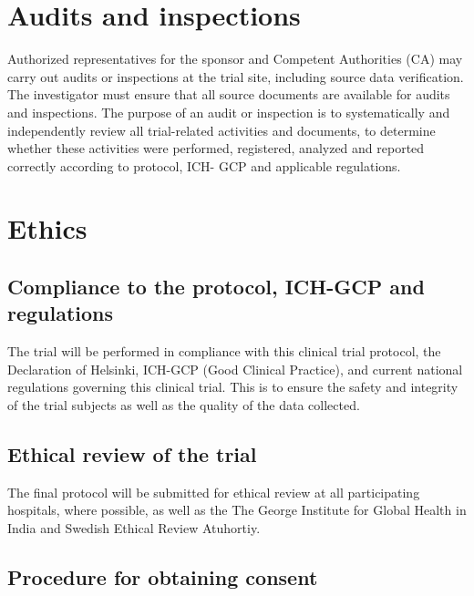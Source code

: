 \documentclass[
]{scrartcl}
\begin{document}
\hypertarget{audits-and-inspections}{%
\section{Audits and inspections}\label{audits-and-inspections}}

Authorized representatives for the sponsor and Competent Authorities
(CA) may carry out audits or inspections at the trial site, including
source data verification. The investigator must ensure that all source
documents are available for audits and inspections. The purpose of an
audit or inspection is to systematically and independently review all
trial-related activities and documents, to determine whether these
activities were performed, registered, analyzed and reported correctly
according to protocol, ICH- GCP and applicable regulations.

\hypertarget{ethics}{%
\section{Ethics}\label{ethics}}

\hypertarget{compliance-to-the-protocol-ich-gcp-and-regulations}{%
\subsection{Compliance to the protocol, ICH-GCP and
regulations}\label{compliance-to-the-protocol-ich-gcp-and-regulations}}

The trial will be performed in compliance with this clinical trial
protocol, the Declaration of Helsinki, ICH-GCP (Good Clinical Practice),
and current national regulations governing this clinical trial. This is
to ensure the safety and integrity of the trial subjects as well as the
quality of the data collected.

\hypertarget{ethical-review-of-the-trial}{%
\subsection{Ethical review of the
trial}\label{ethical-review-of-the-trial}}

The final protocol will be submitted for ethical review at all
participating hospitals, where possible, as well as the The George
Institute for Global Health in India and Swedish Ethical Review
Atuhortiy.

\hypertarget{procedure-for-obtaining-consent}{%
\subsection{Procedure for obtaining
consent}\label{procedure-for-obtaining-consent}}
\end{document}
